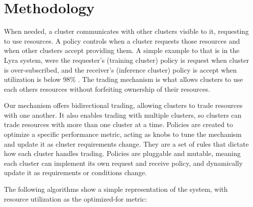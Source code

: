 \section{Methodology}
\vspace{1em}

\vspace{1em}
When needed, a cluster communicates with other clusters visible to it, requesting to use resources. A policy 
controls when a cluster requests those resources and when other clusters accept providing them. 
A simple example to that is in the Lyra system, were the requester's (training cluster) policy is request 
when cluster is over-subscribed, and the receiver's (inference cluster) policy is accept when 
utilization is below 98\% \cite{li_lyra_2023}. The trading mechanism is what allows clusters to use each others 
resources without forfeiting ownership of their resources. 

Our mechanism offers bidirectional trading, allowing clusters to trade resources with one another. It also 
enables trading with multiple clusters, so clusters can trade resources with more than one cluster at a time. 
Policies are created to optimize a specific performance metric, acting as knobs to 
tune the mechanism and update it as cluster requirements change. They are a set of rules that dictate how each 
cluster handles trading. Policies are pluggable and mutable, meaning each cluster can implement its own request and receive 
policy, and dynamically update it as requirements or conditions change.

The following algorithms show a simple representation of the system, with resource utilization as the 
optimized-for metric: \label{example}

